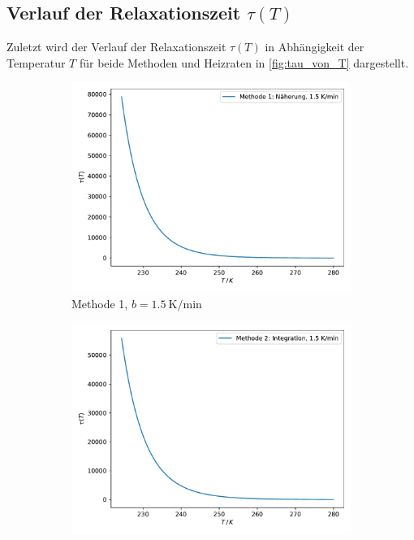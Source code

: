 \newpage
\subsection{Verlauf der Relaxationszeit \texorpdfstring{$\tau (T)$}{tau von T}}
Zuletzt wird der Verlauf der Relaxationszeit $\tau(T)$ in Abhängigkeit der Temperatur $T$ für beide Methoden und Heizraten in \autoref{fig:tau_von_T} dargestellt.
\begin{figure}
    \centering
    \begin{subfigure}[b]{0.475\textwidth}
        \centering
        \includegraphics[width=\textwidth]{content/data/relaxationszeit_approx_15.pdf}
        \caption[]%
        {{\small Methode 1, $b = \SI{1.5}{\kelvin \per \minute}$}}    
        \label{fig:mean and std of net14}
    \end{subfigure}
    \hfill
    \begin{subfigure}[b]{0.475\textwidth}  
        \centering 
        \includegraphics[width=\textwidth]{content/data/relaxationszeit_int_15.pdf}

\end{subfigure}
\end{figure}
